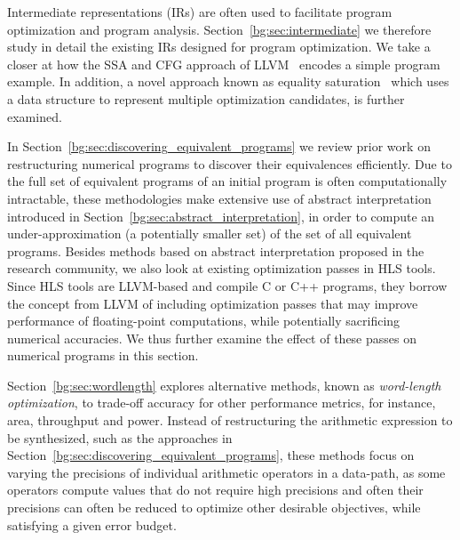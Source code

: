 Intermediate representations (IRs) are often used to facilitate program
optimization and program analysis.  Section~\ref{bg:sec:intermediate} we
therefore study in detail the existing IRs designed for program optimization.
We take a closer at how the SSA and CFG approach of LLVM~\cite{llvm_ir} encodes
a simple program example.  In addition, a novel approach known as equality
saturation~\cite{tate09} which uses a data structure to represent multiple
optimization candidates, is further examined.

In Section~\ref{bg:sec:discovering_equivalent_programs} we review prior work on
restructuring numerical programs to discover their equivalences efficiently.
Due to the full set of equivalent programs of an initial program is often
computationally intractable, these methodologies make extensive use of abstract
interpretation introduced in Section~\ref{bg:sec:abstract_interpretation}, in
order to compute an under-approximation (a potentially smaller set) of the set
of all equivalent programs.  Besides methods based on abstract interpretation
proposed in the research community, we also look at existing optimization
passes in HLS tools.  Since HLS tools are LLVM-based and compile C or C++
programs, they borrow the concept from LLVM of including optimization passes
that may improve performance of floating-point computations, while potentially
sacrificing numerical accuracies.  We thus further examine the effect of these
passes on numerical programs in this section.

Section~\ref{bg:sec:wordlength} explores alternative methods, known as
\emph{word-length optimization}, to trade-off accuracy for other performance
metrics, for instance, area, throughput and power.  Instead of restructuring
the arithmetic expression to be synthesized, such as the approaches in
Section~\ref{bg:sec:discovering_equivalent_programs}, these methods focus on
varying the precisions of individual arithmetic operators in a data-path, as
some operators compute values that do not require high precisions and often
their precisions can often be reduced to optimize other desirable objectives,
while satisfying a given error budget.
